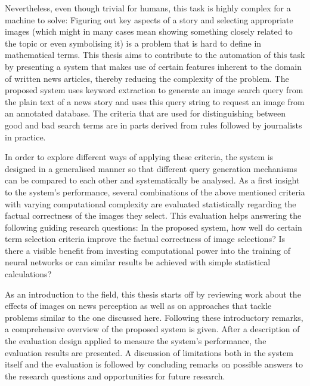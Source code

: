 \documentclass[11pt,a4paper,twoside]{article}
\begin{document}
Nevertheless, even though trivial for humans, this task is highly complex for a machine to solve: Figuring out key aspects of a story and selecting appropriate images (which might in many cases mean showing something closely related to the topic or even symbolising it) is a problem that is hard to define in mathematical terms. This thesis aims to contribute to the automation of this task by presenting a system that makes use of certain features inherent to the domain of written news articles, thereby reducing the complexity of the problem. The proposed system uses keyword extraction to generate an image search query from the plain text of a news story and uses this query string to request an image from an annotated database. The criteria that are used for distinguishing between good and bad search terms are in parts derived from rules followed by journalists in practice.

In order to explore different ways of applying these criteria, the system is designed in a generalised manner so that different query generation mechanisms can be compared to each other and systematically be analysed. As a first insight to the system's performance, several combinations of the above mentioned criteria with varying computational complexity are evaluated statistically regarding the factual correctness of the images they select. This evaluation helps answering the following guiding research questions: In the proposed system, how well do certain term selection criteria improve the factual correctness of image selections? Is there a visible benefit from investing computational power into the training of neural networks or can similar results be achieved with simple statistical calculations?


\bigskip

As an introduction to the field, this thesis starts off by reviewing work about the effects of images on news perception as well as on approaches that tackle problems similar to the one discussed here. Following these introductory remarks, a comprehensive overview of the proposed system is given. After a description of the evaluation design applied to measure the system's performance, the evaluation results are presented. A discussion of limitations both in the system itself and the evaluation is followed by concluding remarks on possible answers to the research questions and opportunities for future research.
\end{document}
